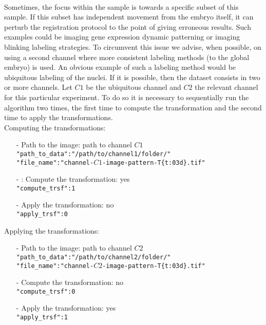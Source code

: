 \documentclass[10pt,a4paper]{book}
\begin{document}
\paragraph{}Sometimes, the focus within the sample is towards a specific subset of this sample. If this subset has independent movement from the embryo itself, it can perturb the registration protocol to the point of giving erroneous results. Such examples could be imaging gene expression dynamic patterning or imaging blinking labeling strategies. To circumvent this issue we advise, when possible, on using a second channel where more consistent labeling methods  (to the global embryo) is used. An obvious example of such a labeling method would be ubiquitous labeling of the nuclei. If it is possible, then the dataset consists in two or more channels. Let $C1$ be the ubiquitous channel and $C2$ the relevant channel for this particular experiment. To do so it is necessary to sequentially run the algorithm two times, the first time to compute the transformation and the second time to apply the transformations.\\
Computing the transformations:
	\begin{itemize}
		\item[-] Path to the image: path to channel $C1$\\
					\texttt{"path\_to\_data":"/path/to/channel1/folder/"}\\
					\texttt{"file\_name":"channel-$C1$-image-pattern-T\{t:03d\}.tif"}
		\item[-] : Compute the transformation: yes\\
					\texttt{"compute\_trsf":1}
		\item[-] Apply the transformation: no\\
					\texttt{"apply\_trsf":0}\\
	\end{itemize}
Applying the transformations:
	\begin{itemize}
		\item[-] Path to the image: path to channel $C2$\\
					\texttt{"path\_to\_data":"/path/to/channel2/folder/"}\\
					\texttt{"file\_name":"channel-$C2$-image-pattern-T\{t:03d\}.tif"}
		\item[-] Compute the transformation: no\\
					\texttt{"compute\_trsf":0}
		\item[-] Apply the transformation: yes\\
					\texttt{"apply\_trsf":1}\\
	\end{itemize}
\end{document}
